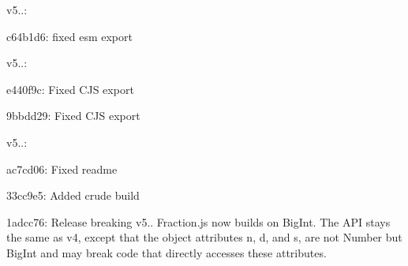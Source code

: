 v5..:\+
\begin{DoxyItemize}
\item c64b1d6:\+ fixed esm export
\end{DoxyItemize}

v5..:\+
\begin{DoxyItemize}
\item e440f9c:\+ Fixed CJS export
\item 9bbdd29:\+ Fixed CJS export
\end{DoxyItemize}

v5..:\+
\begin{DoxyItemize}
\item ac7cd06:\+ Fixed readme
\item 33cc9e5:\+ Added crude build
\item 1adcc76:\+ Release breaking v5.. Fraction.\+js now builds on Big\+Int. The API stays the same as v4, except that the object attributes {\ttfamily n}, {\ttfamily d}, and {\ttfamily s}, are not Number but Big\+Int and may break code that directly accesses these attributes. 
\end{DoxyItemize}